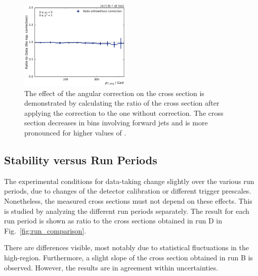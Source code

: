 \begin{figure}[htbp]
    \includegraphics[width=0.47\textwidth]{figures/measurement/rap_corr_data_yb2ys0.pdf}
    \caption[Effect of angular correction]{The effect of the angular correction
        on the cross section  is demonstrated by calculating the ratio of the
        cross section after applying the correction to the one without
        correction. The cross section decreases in bins involving forward jets
        and is more pronounced for higher values of \ystar.}
    \label{fig:rap_corr_data}
\end{figure}

\subsection{Stability versus Run Periods}

The experimental conditions for data-taking change slightly over the various run
periods, due to changes of the detector calibration or different trigger
prescales. Nonetheless, the measured cross sections must not depend on
these effects. This is studied by analyzing the different run periods
separately. The result for each run period is shown as ratio to the cross
sections obtained in run D in Fig.~\ref{fig:run_comparison}. 

There are differences visible, most notably due to statistical fluctuations in the
high-\pt region. Furthermore, a slight slope of the cross section obtained in run
B is observed. However, the results are in agreement within uncertainties.

